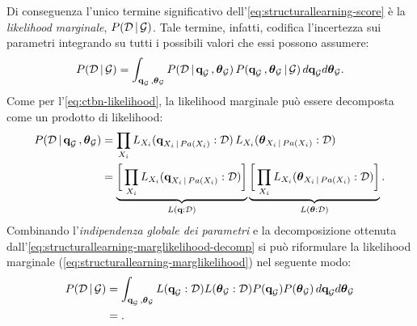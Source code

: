 Di conseguenza l'unico termine significativo dell'\autoref{eq:structurallearning-score} è la \emph{likelihood marginale}, $P(\mathcal{D}\,\arrowvert\,\mathcal{G})$. Tale termine, infatti, codifica l'incertezza sui parametri integrando su tutti i possibili valori che essi possono assumere:
\begin{equation}\label{eq:structurallearning-marglikelihood}
P(\mathcal{D}\,\arrowvert\,\mathcal{G}) = \int_{\boldsymbol{\textbf{\text{q}}}_{\mathcal{G}}\,,\boldsymbol{\textbf{\text{$\theta$}}}_{\mathcal{G}}} P(\mathcal{D}\,\arrowvert\,\boldsymbol{\textbf{\text{q}}}_{\mathcal{G}}\,,\boldsymbol{\textbf{\text{$\theta$}}}_{\mathcal{G}}) \, P(\boldsymbol{\textbf{\text{q}}}_{\mathcal{G}}\,,\boldsymbol{\textbf{\text{$\theta$}}}_{\mathcal{G}}\,\arrowvert\,\mathcal{G}) \, d\boldsymbol{\textbf{\text{q}}}_{\mathcal{G}} d\boldsymbol{\textbf{\text{$\theta$}}}_{\mathcal{G}}\text{.}
\end{equation}
Come per l'\autoref{eq:ctbn-likelihood}, la likelihood marginale può essere decomposta come un prodotto di likelihood:
\begin{equation}\label{eq:structurallearning-marglikelihood-decomp}
\begin{split}
P(\mathcal{D}\,\arrowvert\,\boldsymbol{\textbf{\text{q}}}_{\mathcal{G}}\,,\boldsymbol{\textbf{\text{$\theta$}}}_{\mathcal{G}}) &= \prod_{\mathnormal{X}_i} L_{\mathnormal{X}_i}(\boldsymbol{\textbf{\text{q}}}_{\mathnormal{X}_i\,\arrowvert\,Pa(\mathnormal{X}_i)}:\mathcal{D}) \, L_{\mathnormal{X}_i}(\boldsymbol{\textbf{\text{$\theta$}}}_{\mathnormal{X}_i\,\arrowvert\,Pa(\mathnormal{X}_i)}:\mathcal{D})\\
&= \underbrace{\bigg[\prod_{\mathnormal{X}_i} L_{\mathnormal{X}_i}(\boldsymbol{\textbf{\text{q}}}_{\mathnormal{X}_i\,\arrowvert\,Pa(\mathnormal{X}_i)}:\mathcal{D}) \bigg]}_{L(\boldsymbol{\textbf{\text{q}}}:\mathcal{D})} \underbrace{\bigg[\prod_{\mathnormal{X}_i} L_{\mathnormal{X}_i}(\boldsymbol{\textbf{\text{$\theta$}}}_{\mathnormal{X}_i\,\arrowvert\,Pa(\mathnormal{X}_i)}:\mathcal{D}) \bigg]}_{L(\boldsymbol{\textbf{\text{$\theta$}}}:\mathcal{D})} \text{.}
\end{split}
\end{equation}
Combinando l'\emph{indipendenza globale dei parametri} e la decomposizione ottenuta dall'\autoref{eq:structurallearning-marglikelihood-decomp} si può riformulare la likelihood marginale (\autoref{eq:structurallearning-marglikelihood}) nel seguente modo:
\begin{equation}
\begin{split}
P(\mathcal{D}\,\arrowvert\,\mathcal{G}) &= \int_{\boldsymbol{\textbf{\text{q}}}_{\mathcal{G}}\,,\boldsymbol{\textbf{\text{$\theta$}}}_{\mathcal{G}}} L(\boldsymbol{\textbf{\text{q}}}_{\mathcal{G}}:\mathcal{D}) L(\boldsymbol{\textbf{\text{$\theta$}}}_{\mathcal{G}}:\mathcal{D}) P(\boldsymbol{\textbf{\text{q}}}_{\mathcal{G}}) P(\boldsymbol{\textbf{\text{$\theta$}}}_{\mathcal{G}}) \, d\boldsymbol{\textbf{\text{q}}}_{\mathcal{G}} d\boldsymbol{\textbf{\text{$\theta$}}}_{\mathcal{G}} \nonumber \\
&= \text{.}
\end{split}
\end{equation}


